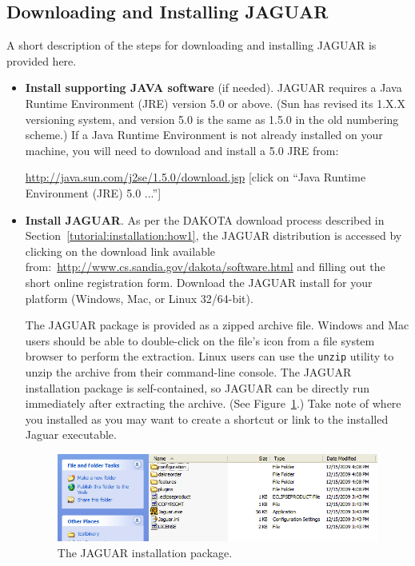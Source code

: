 \subsection{Downloading and Installing JAGUAR}

A short description of the steps for downloading and installing JAGUAR
is provided here.

\begin{itemize}
\item \textbf{Install supporting JAVA software} (if needed).  JAGUAR
  requires a Java Runtime Environment (JRE) version 5.0 or above. (Sun
  has revised its 1.X.X versioning system, and version 5.0 is the same
  as 1.5.0 in the old numbering scheme.)  If a Java Runtime
  Environment is not already installed on your machine, you will need
  to download and install a 5.0 JRE from:

\url{http://java.sun.com/j2se/1.5.0/download.jsp} 
{\small [click on ``Java Runtime Environment (JRE) 5.0 ...'']}

\item \textbf{Install JAGUAR}.  As per the DAKOTA download process
  described in Section~\ref{tutorial:installation:how1}, the JAGUAR
  distribution is accessed by clicking on the download link available
  from:~\url{http://www.cs.sandia.gov/dakota/software.html} and
  filling out the short online registration form.  Download the JAGUAR
  install for your platform (Windows, Mac, or Linux 32/64-bit).

The JAGUAR package is provided as a zipped archive file.  Windows and
Mac users should be able to double-click on the file's icon from a
file system browser to perform the extraction.  Linux users can use
the {\tt unzip} utility to unzip the archive from their command-line
console.  The JAGUAR installation package is self-contained, so JAGUAR
can be directly run immediately after extracting the archive. (See
Figure~\ref{fig:input:jag_package}.)  Take note of where you installed
as you may want to create a shortcut or link to the installed Jaguar
executable.
\begin{figure}
  \centering
  \includegraphics[scale=0.6]{images/jag_package}
  \caption{The JAGUAR installation package.}
  \label{fig:input:jag_package}
\end{figure}

\end{itemize}


